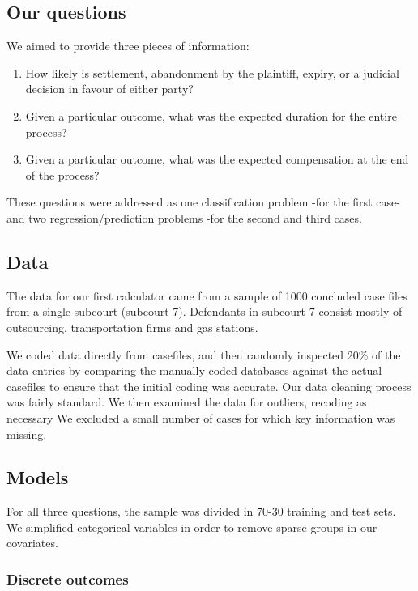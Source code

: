 \documentclass[]{article}
\begin{document}
\subsection{Our questions}\label{our-questions}

We aimed to provide three pieces of information:

\begin{enumerate}
\def\labelenumi{\arabic{enumi}.}
\item
  How likely is settlement, abandonment by the plaintiff, expiry, or a
  judicial decision in favour of either party?
\item
  Given a particular outcome, what was the expected duration for the
  entire process?
\item
  Given a particular outcome, what was the expected compensation at the
  end of the process?
\end{enumerate}

These questions were addressed as one classification problem -for the
first case- and two regression/prediction problems -for the second and
third cases.

\subsection{Data}\label{data}

The data for our first calculator came from a sample of 1000 concluded
case files from a single subcourt (subcourt 7). Defendants in subcourt 7
consist mostly of outsourcing, transportation firms and gas stations.

We coded data directly from casefiles, and then randomly inspected 20\%
of the data entries by comparing the manually coded databases against
the actual casefiles to ensure that the initial coding was accurate. Our
data cleaning process was fairly standard. We then examined the data for
outliers, recoding as necessary We excluded a small number of cases for
which key information was missing.

\subsection{Models}\label{models}

For all three questions, the sample was divided in 70-30 training and
test sets. We simplified categorical variables in order to remove sparse
groups in our covariates.

\subsubsection{Discrete outcomes}\label{discrete-outcomes}
\end{document}
